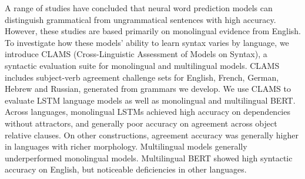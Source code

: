 A range of studies have concluded that neural word prediction models can distinguish grammatical from ungrammatical sentences with high accuracy. However, these studies are based primarily on monolingual evidence from English. To investigate how these models' ability to learn syntax varies by language, we introduce CLAMS (Cross-Linguistic Assessment of Models on Syntax), a syntactic evaluation suite for monolingual and multilingual models. CLAMS includes subject-verb agreement challenge sets for English, French, German, Hebrew and Russian, generated from grammars we develop. We use CLAMS to evaluate LSTM language models as well as monolingual and multilingual BERT. Across languages, monolingual LSTMs achieved high accuracy on dependencies without attractors, and generally poor accuracy on agreement across object relative clauses. On other constructions, agreement accuracy was generally higher in languages with richer morphology. Multilingual models generally underperformed monolingual models. Multilingual BERT showed high syntactic accuracy on English, but noticeable deficiencies in other languages.
